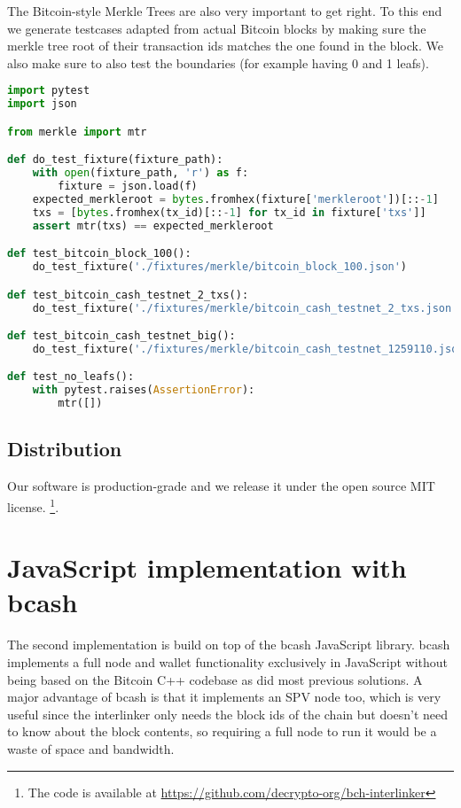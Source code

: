 The Bitcoin-style Merkle Trees are also very important to get right. To this end we generate testcases adapted from actual Bitcoin blocks by making sure the merkle tree root of their transaction ids matches the one found in the block. We also make sure to also test the boundaries (for example having 0 and 1 leafs).

\begin{lstlisting}[language=Python]
import pytest
import json

from merkle import mtr

def do_test_fixture(fixture_path):
    with open(fixture_path, 'r') as f:
        fixture = json.load(f)
    expected_merkleroot = bytes.fromhex(fixture['merkleroot'])[::-1]
    txs = [bytes.fromhex(tx_id)[::-1] for tx_id in fixture['txs']]
    assert mtr(txs) == expected_merkleroot

def test_bitcoin_block_100():
    do_test_fixture('./fixtures/merkle/bitcoin_block_100.json')

def test_bitcoin_cash_testnet_2_txs():
    do_test_fixture('./fixtures/merkle/bitcoin_cash_testnet_2_txs.json')

def test_bitcoin_cash_testnet_big():
    do_test_fixture('./fixtures/merkle/bitcoin_cash_testnet_1259110.json')

def test_no_leafs():
    with pytest.raises(AssertionError):
        mtr([])
\end{lstlisting}

\subsection{Distribution}

Our software is production-grade and we release it under the open source MIT license.
\footnote{The code is available at \url{https://github.com/decrypto-org/bch-interlinker}}.

\section{JavaScript implementation with bcash}
The second implementation is build on top of the bcash JavaScript library. bcash implements a full node and wallet functionality exclusively in JavaScript without being based on the Bitcoin C++ codebase as did most previous solutions. A major advantage of bcash is that it implements an SPV node too, which is very useful since the interlinker only needs the block ids of the chain but doesn't need to know about the block contents, so requiring a full node to run it would be a waste of space and bandwidth.

